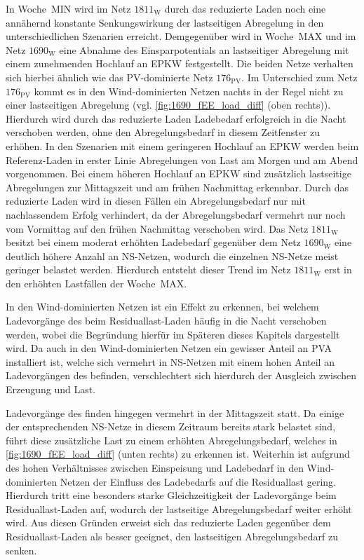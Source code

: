 In Woche~MIN wird im Netz \(1811_{\text{W}}\) durch das reduzierte Laden noch eine annähernd konstante Senkungswirkung der lastseitigen Abregelung in den unterschiedlichen Szenarien erreicht.
Demgegenüber wird in Woche~MAX und im Netz \(1690_{\text{W}}\) eine Abnahme des Einsparpotentials an lastseitiger Abregelung mit einem zunehmenden Hochlauf an \gls{EPKW} festgestellt.
Die beiden Netze verhalten sich hierbei ähnlich wie das \gls{PV}-dominierte Netz \(176_{\text{PV}}\).
Im Unterschied zum Netz \(176_{\text{PV}}\) kommt es in den Wind-dominierten Netzen nachts in der Regel nicht zu einer lastseitigen Abregelung (vgl. \autoref{fig:1690_fEE_load_diff} (oben rechts)).
Hierdurch wird durch das reduzierte Laden Ladebedarf erfolgreich in die Nacht verschoben werden, ohne den Abregelungsbedarf in diesem Zeitfenster zu erhöhen.
In den Szenarien mit einem geringeren Hochlauf an \gls{EPKW} werden beim Referenz-Laden in erster Linie Abregelungen von Last am Morgen und am Abend vorgenommen.
Bei einem höheren Hochlauf an \gls{EPKW} sind zusätzlich lastseitige Abregelungen zur Mittagszeit und am frühen Nachmittag erkennbar.
Durch das reduzierte Laden wird in diesen Fällen ein Abregelungsbedarf nur mit nachlassendem Erfolg verhindert, da der Abregelungsbedarf vermehrt nur noch vom Vormittag auf den frühen Nachmittag verschoben wird.
Das Netz \(1811_{\text{W}}\) besitzt bei einem moderat erhöhten Ladebedarf gegenüber dem Netz \(1690_{\text{W}}\) eine deutlich höhere Anzahl an \gls{NS}-Netzen, wodurch die einzelnen \gls{NS}-Netze meist geringer belastet werden.
Hierdurch entsteht dieser Trend im Netz \(1811_{\text{W}}\) erst in den erhöhten Lastfällen der Woche~MAX.



In den Wind-dominierten Netzen ist ein Effekt zu erkennen, bei welchem Ladevorgänge des \UC \zH beim Residuallast-Laden häufig in die Nacht verschoben werden, wobei die Begründung hierfür im Späteren dieses Kapitels dargestellt wird.
Da auch in den Wind-dominierten Netzen ein gewisser Anteil an \gls{PVA} installiert ist, welche sich vermehrt in \gls{NS}-Netzen mit einem hohen Anteil an Ladevorgängen des \UC \zH befinden, verschlechtert sich hierdurch der Ausgleich zwischen Erzeugung und Last.

Ladevorgänge des \UC \Firmeparkplatz finden hingegen vermehrt in der Mittagszeit statt.
Da einige der entsprechenden \gls{NS}-Netze in diesem Zeitraum bereits stark belastet sind, führt diese zusätzliche Last zu einem erhöhten Abregelungsbedarf, welches in \autoref{fig:1690_fEE_load_diff} (unten rechts) zu erkennen ist.
Weiterhin ist aufgrund des hohen Verhältnisses zwischen Einspeisung und Ladebedarf in den Wind-dominierten Netzen der Einfluss des Ladebedarfs auf die Residuallast gering.
Hierdurch tritt eine besonders starke Gleichzeitigkeit der Ladevorgänge beim Residuallast-Laden auf, wodurch der lastseitige Abregelungsbedarf weiter erhöht wird.
Aus diesen Gründen erweist sich das reduzierte Laden gegenüber dem Residuallast-Laden als besser geeignet, den lastseitigen Abregelungsbedarf zu senken.\medskip

